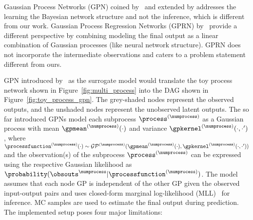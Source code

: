 Gaussian Process Networks (GPN) coined by~\cite{friedman2000gpn} and extended by \cite{giudice2024bayesian} addresses the learning the Bayesian network structure and not the inference, which is different from our work. Gaussian Process Regression Networks (GPRN) by~\cite{friedman2000gpn, wilson2011gaussian} provide a different perspective by combining modeling the final output as a linear combination of Gaussian processes (like neural network structure).
GPRN does not incorporate the intermediate observations and caters to a problem statement different from ours.

GPN introduced by~\cite{astudillo2021bayesian, aglietti2020causal} as the surrogate model would translate the toy process network shown in Figure~\ref{fig:multi_process} into the DAG shown in Figure~\ref{fig:toy_process_gpn}. The grey-shaded nodes represent the observed outputs, and the unshaded nodes represent the unobserved latent outputs. The so far introduced GPNs model each subprocess $\process^{(\numprocess)}$ as a Gaussian process with mean $\gpmean^{(\numprocess)}(\cdot)$ and variance $\gpkernel^{(\numprocess)}(\cdot, \cdot')$, where $\processfunction^{(\numprocess)}(\cdot)\sim\mathcal{GP}^{(\numprocess)}(\gpmean^{(\numprocess)}(\cdot),\gpkernel^{(\numprocess)}(\cdot, \cdot'))$ and the observation(s) of the subprocess $\process^{(\numprocess)}$ can be expressed using the respective Gaussian likelihood as $\probability(\obsouts^{\numprocess}\vert\processfunction^{(\numprocess)})$. The model assumes that each node GP is independent of the other GP given the observed input-output pairs and uses closed-form marginal log-likelihood (MLL)~\citep{rasmussen2003gaussian} for inference.
MC samples are used to estimate the final output during prediction. The implemented setup poses four major limitations:
